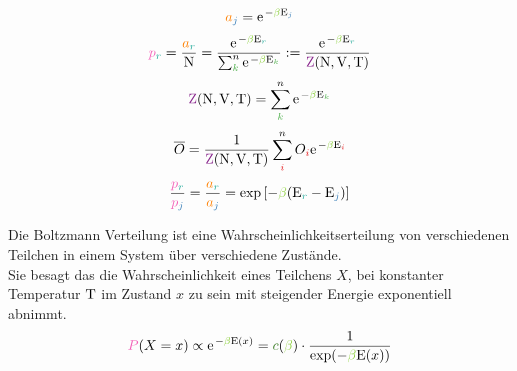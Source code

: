 \begin{emphbox}\nospacing
  \begin{align}
      \mca_{\idxj}=\e^{-\betac\Ez_{\idxj}}
    \end{align}
    \begin{align}
      \pb_{\idxr}=\frac{\mca_{\idxr}}{\Nz}=\frac{\e^{-\betac\Ez_{\idxr}}}{\sum_{\idxk}^n\e^{-\betac\Ez_{\idxk}}}:=\frac{\e^{-\betac\Ez_{\idxr}}}{\Zz(\Nz,\Vz,\Tz)}\label{eq:BoltzMannProb}
    \end{align}
    \begin{align}
      \Zz(\Nz,\Vz,\Tz)=\sum_{\idxk}^n\e^{-\betac\Ez_{\idxk}}
    \end{align}
    \begin{align}
      \overline{O}=\frac{1}{\Zz(\Nz,\Vz,\Tz)}\sum_{\idxi}^n O_{\idxi}\e^{-\betac\Ez_{\idxi}}
    \end{align}
    \begin{align}
      \frac{\pb_{\idxr}}{\pb_{\idxj}}=\frac{\mca_{\idxr}}{\mca_{\idxj}}=\exp\left[-\betac(\Ez_{\idxr}-\Ez_{\idxj})\right]
    \end{align}
\end{emphbox}
\begin{defnbox}\nospacing
  \begin{defn}
    Die Boltzmann Verteilung ist eine Wahrscheinlichkeitserteilung von verschiedenen Teilchen in einem System über verschiedene Zustände.\\
    Sie besagt das die Wahrscheinlichkeit eines Teilchens $X$, bei konstanter Temperatur $\mathrm{T}$ im Zustand $x$ zu sein mit steigender Energie
    exponentiell abnimmt.
    \begin{align}
      \Pb(X=x)\propto\e^{-\betac\Ez(x)}=\mcc(\betac)\cdot\frac{1}{\exp(-\betac\Ez(x))}
    \end{align}
  \end{defn}
\end{defnbox}
